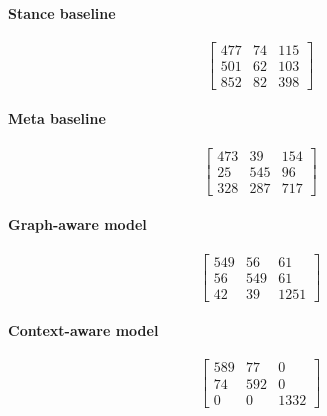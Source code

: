 \documentclass[11pt,a4paper]{article}
\begin{document}
\paragraph{Stance baseline}
\[
\begin{bmatrix}
477 & 74 & 115 \\
501 & 62 & 103 \\
852 & 82 & 398
\end{bmatrix}
\]

\paragraph{Meta baseline}
\[
\begin{bmatrix}
473 & 39 & 154 \\
25 & 545 & 96 \\
328 & 287 & 717
\end{bmatrix}
\]

\paragraph{Graph-aware model}
\[
\begin{bmatrix}
549 & 56 & 61 \\
56 & 549 & 61 \\
42 & 39 & 1251
\end{bmatrix}
\]

\paragraph{Context-aware model}
\[
\begin{bmatrix}
589 & 77 & 0 \\
74 & 592 & 0 \\
0 & 0 & 1332
\end{bmatrix}
\]
\end{document}
